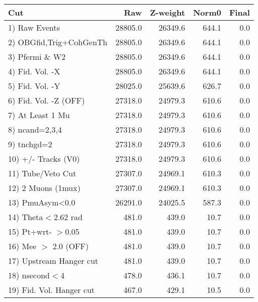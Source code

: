  \begin{table}[h!]\centering
 \begin{tabular}{||l||r|r|r|r||}
 \hline
 \hline
 Cut & Raw & Z-weight & Norm0 & Final \\
 \hline
  1) Raw Events           &     28805.0 &     26349.6 &       644.1 &         0.0 \\
  2) OBGfid,Trig+CohGenTh &     28805.0 &     26349.6 &       644.1 &         0.0 \\
  3) Pfermi \& W2         &     28805.0 &     26349.6 &       644.1 &         0.0 \\
  4) Fid. Vol. -X         &     28805.0 &     26349.6 &       644.1 &         0.0 \\
  5) Fid. Vol. -Y         &     28025.0 &     25639.6 &       626.7 &         0.0 \\
  6) Fid. Vol. -Z (OFF)   &     27318.0 &     24979.3 &       610.6 &         0.0 \\
  7) At Least 1 Mu        &     27318.0 &     24979.3 &       610.6 &         0.0 \\
  8) ncand=2,3,4          &     27318.0 &     24979.3 &       610.6 &         0.0 \\
  9) tnchgd=2             &     27318.0 &     24979.3 &       610.6 &         0.0 \\
 10) +/- Tracks (V0)      &     27318.0 &     24979.3 &       610.6 &         0.0 \\
 11) Tube/Veto Cut        &     27307.0 &     24969.1 &       610.3 &         0.0 \\
 12) 2 Muons (1mux)       &     27307.0 &     24969.1 &       610.3 &         0.0 \\
 13) PmuAsym<0.0          &     26291.0 &     24025.5 &       587.3 &         0.0 \\
 14) Theta$<$2.62 rad     &       481.0 &       439.0 &        10.7 &         0.0 \\
 15) Pt+wrt- $>$0.05      &       481.0 &       439.0 &        10.7 &         0.0 \\
 16) Mee $>$ 2.0  (OFF)   &       481.0 &       439.0 &        10.7 &         0.0 \\
 17) Upstream Hanger cut  &       481.0 &       439.0 &        10.7 &         0.0 \\
 18) nsecond$<$4          &       478.0 &       436.1 &        10.7 &         0.0 \\
 19) Fid. Vol. Hanger cut &       467.0 &       429.1 &        10.5 &         0.0 \\

\end{tabular}
\end{table}

